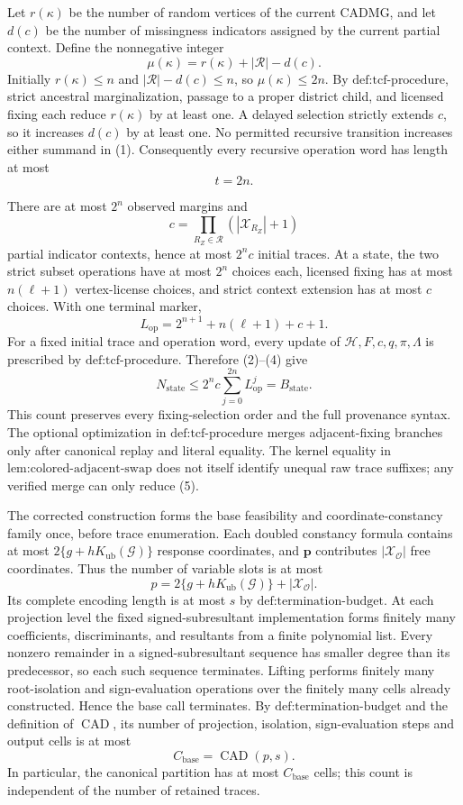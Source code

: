 Let \(r(\kappa)\) be the number of random vertices of the current CADMG, and let \(d(c)\) be the number of missingness indicators assigned by the current partial context. Define the nonnegative integer
\[
\mu(\kappa)=r(\kappa)+|\mathcal R|-d(c).
\tag{1}
\]
Initially \(r(\kappa)\leq n\) and \(|\mathcal R|-d(c)\leq n\), so \(\mu(\kappa)\leq2n\). By \(\text{def:tcf-procedure}\), strict ancestral marginalization, passage to a proper district child, and licensed fixing each reduce \(r(\kappa)\) by at least one. A delayed selection strictly extends \(c\), so it increases \(d(c)\) by at least one. No permitted recursive transition increases either summand in (1). Consequently every recursive operation word has length at most
\[
t=2n.
\tag{2}
\]

There are at most \(2^n\) observed margins and
\[
c=\prod_{R_Z\in\mathcal R}(|\mathcal X_{R_Z}|+1)
\tag{3}
\]
partial indicator contexts, hence at most \(2^n c\) initial traces. At a state, the two strict subset operations have at most \(2^n\) choices each, licensed fixing has at most \(n(\ell+1)\) vertex-license choices, and strict context extension has at most \(c\) choices. With one terminal marker,
\[
L_{\mathrm{op}}=2^{n+1}+n(\ell+1)+c+1.
\tag{4}
\]
For a fixed initial trace and operation word, every update of \(\mathcal H,F,c,q,\pi,\Lambda\) is prescribed by \(\text{def:tcf-procedure}\). Therefore (2)--(4) give
\[
N_{\mathrm{state}}
\leq2^n c\sum_{j=0}^{2n}L_{\mathrm{op}}^j
=B_{\mathrm{state}}.
\tag{5}
\]
This count preserves every fixing-selection order and the full provenance syntax. The optional optimization in \(\text{def:tcf-procedure}\) merges adjacent-fixing branches only after canonical replay and literal equality. The kernel equality in \(\text{lem:colored-adjacent-swap}\) does not itself identify unequal raw trace suffixes; any verified merge can only reduce (5).

The corrected construction forms the base feasibility and coordinate-constancy family once, before trace enumeration. Each doubled constancy formula contains at most \(2\{g+hK_{\mathrm{ub}}(\mathcal G)\}\) response coordinates, and \(\mathbf p\) contributes \(|\mathcal X_{\mathcal O}|\) free coordinates. Thus the number of variable slots is at most
\[
p=2\{g+hK_{\mathrm{ub}}(\mathcal G)\}+|\mathcal X_{\mathcal O}|.
\tag{6}
\]
Its complete encoding length is at most \(s\) by \(\text{def:termination-budget}\). At each projection level the fixed signed-subresultant implementation forms finitely many coefficients, discriminants, and resultants from a finite polynomial list. Every nonzero remainder in a signed-subresultant sequence has smaller degree than its predecessor, so each such sequence terminates. Lifting performs finitely many root-isolation and sign-evaluation operations over the finitely many cells already constructed. Hence the base call terminates. By \(\text{def:termination-budget}\) and the definition of \(\operatorname{CAD}\), its number of projection, isolation, sign-evaluation steps and output cells is at most
\[
C_{\mathrm{base}}=\operatorname{CAD}(p,s).
\tag{7}
\]
In particular, the canonical partition has at most \(C_{\mathrm{base}}\) cells; this count is independent of the number of retained traces.

